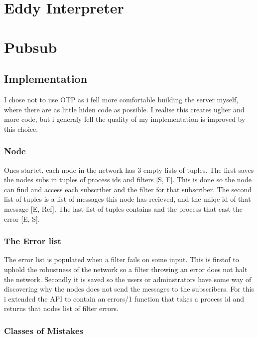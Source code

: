 \documentclass{article}
\begin{document}
\section{Eddy Interpreter}

\section{Pubsub}

\subsection{Implementation}

I chose not to use OTP as i fell more comfortable building the server
myself, where there are as little hiden code as possible. I realise
this creates uglier and more code, but i generaly fell the quality
of my implementation is improved by this choice.

\subsubsection{Node}

Ones startet, each node in the network has 3 empty lists of tuples. 
The first saves the nodes subs in tuples of process ids and filters 
[{S, F}]. This is done so the node can find and access each 
subscriber and the filter for that subscriber. 
The second list of tuples is a list of messages this node has 
recieved, and the uniqe id of that message [{E, Ref]}. 
The last list of tuples contains and the process that cast the error [{E, S}].  

\subsubsection{The Error list}

The error list is populated when a filter fails on some input. This
is firstof to uphold the robustness of the network so a filter throwing an
error does not halt the network. Secondly it is saved so the users or adminstrators
have some way of discovering why the nodes does not send the
messages to the subscribers. For this i extended the API to contain
an errors/1 function that takes a process id and returns that nodes
list of filter errors.

\subsubsection{Classes of Mistakes}
\end{document}
